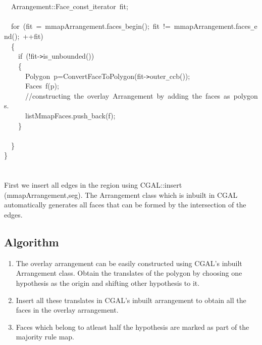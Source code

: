 \documentclass[a4paper,10pt]{article}
\begin{document}
{\jttstylea \\
\jttstylea \\
\jttstylea ~~\jttstylek Arrangement::Face\verb#_#const\verb#_#iterator~fit;\\
\jttstylea \\
\jttstylea ~~\jttstylee for~\jttstylei (\jttstylek fit~=~mmapArrangement.faces\verb#_#begin\jttstylei ()\jttstylek ;~fit~!=~mmapArrangement.faces\verb#_#end\jttstylei ()\jttstylek ;~++fit\jttstylei )\\
\jttstylea ~~\jttstylei \{\\
\jttstylea ~~~~\jttstylee if~\jttstylei (\jttstylek !fit-\verb#>#is\verb#_#unbounded\jttstylei ())\\
\jttstylea ~~~~\jttstylei \{\\
\jttstylea ~~~~~~\jttstylek Polygon~p=ConvertFaceToPolygon\jttstylei (\jttstylek fit-\verb#>#outer\verb#_#ccb\jttstylei ())\jttstylek ;\\
\jttstylea ~~~~~~\jttstylek Faces~f\jttstylei (\jttstylek p\jttstylei )\jttstylek ;\\
\jttstylea ~~~~~~\jttstyled //constructing~the~overlay~Arrangement~by~adding~the~faces~as~polygons.\\
\jttstylea ~~~~~~\jttstylek listMmapFaces.push\verb#_#back\jttstylei (\jttstylek f\jttstylei )\jttstylek ;\\
\jttstylea ~~~~\jttstylei \}\\
\jttstylea \\
\jttstylea ~~\jttstylei \}\\
\jttstylei \}\\
\jttstylea \\
\jttstylea \jttstylea 
\\

}
First we insert all edges in the region using CGAL::insert (mmapArrangement,seg). The Arrangement class which is inbuilt in CGAL 
automatically generates all faces that can be formed by the intersection of the edges.


\newpage


\subsection{Algorithm}
\begin{enumerate}
\item
The overlay arrangement can be easily constructed using CGAL's inbuilt Arrangement class. Obtain the translates of the polygon by 
choosing one hypothesis as the origin and shifting other hypothesis to it.
\item
Insert all these translates in CGAL's inbuilt arrangement to obtain all the faces in the overlay arrangement.
\item
Faces which belong to atleast half the hypothesis are marked as part of the majority rule map.
\end{enumerate}
\end{document}
